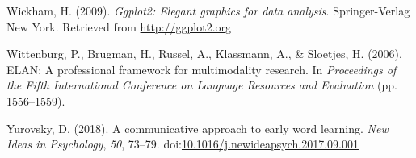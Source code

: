 \documentclass[floatsintext,man]{apa6}
\theoremstyle{definition}
\theoremstyle{definition}
\theoremstyle{definition}
\theoremstyle{remark}
\begin{document}
\hypertarget{ref-R-ggplot2}{}
Wickham, H. (2009). \emph{Ggplot2: Elegant graphics for data analysis}.
Springer-Verlag New York. Retrieved from \url{http://ggplot2.org}

\hypertarget{ref-ELAN}{}
Wittenburg, P., Brugman, H., Russel, A., Klassmann, A., \& Sloetjes, H.
(2006). ELAN: A professional framework for multimodality research. In
\emph{Proceedings of the Fifth International Conference on Language
Resources and Evaluation} (pp. 1556--1559).

\hypertarget{ref-yurovsky2018communicative}{}
Yurovsky, D. (2018). A communicative approach to early word learning.
\emph{New Ideas in Psychology}, \emph{50}, 73--79.
doi:\href{https://doi.org/10.1016/j.newideapsych.2017.09.001}{10.1016/j.newideapsych.2017.09.001}

\endgroup
\end{document}
